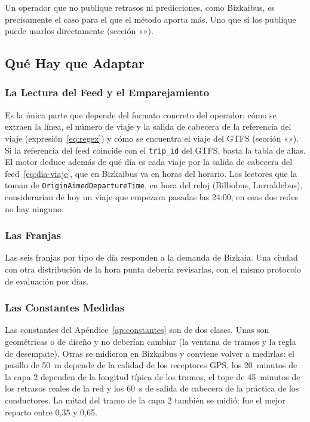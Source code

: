 \noindent Un operador que no publique retrasos ni predicciones, como Bizkaibus, es precisamente el caso para el que el
método aporta más. Uno que sí los publique puede usarlos directamente (sección «»).

\subsection{Qué Hay que Adaptar}
\label{sec:adaptar}

\subsubsection{La Lectura del Feed y el Emparejamiento} Es la única parte que depende del formato concreto del operador:
cómo se extraen la línea, el número de viaje y la salida de cabecera de la referencia del viaje
(expresión~\eqref{eq:regex}) y cómo se encuentra el viaje del GTFS (sección «»). Si la referencia
del feed coincide con el \texttt{trip\_id} del GTFS, basta la tabla de alias. El motor deduce además de qué día es cada
viaje por la salida de cabecera del feed~\eqref{eq:dia-viaje}, que en Bizkaibus va en horas del horario. Los lectores
que la toman de \texttt{OriginAimedDepartureTime}, en hora del reloj (Bilbobus, Lurraldebus), considerarían de hoy un
viaje que empezara pasadas las 24:00; en esas dos redes no hay ninguno.

\subsubsection{Las Franjas} Las seis franjas por tipo de día responden a la demanda de Bizkaia. Una ciudad con otra
distribución de la hora punta debería revisarlas, con el mismo protocolo de evaluación por días.

\subsubsection{Las Constantes Medidas} Las constantes del Apéndice~\ref{ap:constantes} son de dos clases. Unas son
geométricas o de diseño y no deberían cambiar (la ventana de tramos y la regla de desempate). Otras se midieron en Bizkaibus y conviene volver a medirlas: el pasillo de 50~m depende de la calidad de los
receptores GPS, los 20~minutos de la capa 2 dependen de la longitud típica de los tramos, el tope de 45~minutos de los
retrasos reales de la red y los 60~s de salida de cabecera de la práctica de los conductores. La mitad del tramo de la capa 2 también se midió:
fue el mejor reparto entre 0,35 y 0,65.

